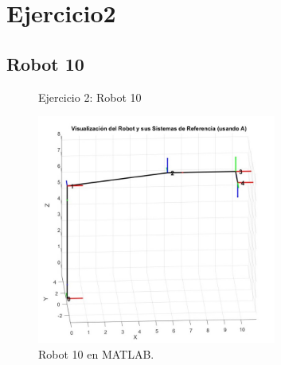 \section{\textbf{Ejercicio2}}
\subsection{\textbf{Robot 10}}

\begin{figure}[H]
	\centering
	\hfill
	\caption{Ejercicio 2: Robot 10}
	\label{fig:Robot10}
\end{figure}
\begin{figure}[H]
	\centering
	\includegraphics[width=0.7\textwidth]{img/Ej23.jpg}
	\caption{Robot 10 en MATLAB.}
	\label{fig:Robot10matlab}
\end{figure}
